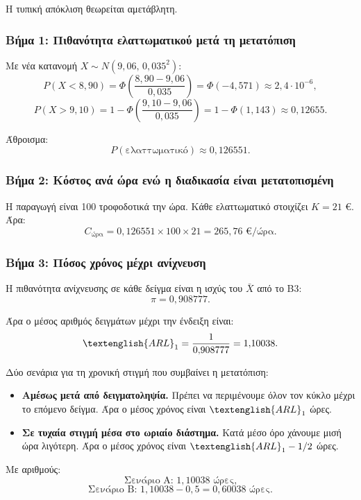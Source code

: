 \documentclass[12pt,a4paper]{article}
\newcommand{\ARL}{\textenglish{ARL}}
\begin{document}
Η τυπική απόκλιση θεωρείται αμετάβλητη.

\subsubsection*{Βήμα 1: Πιθανότητα ελαττωματικού μετά τη μετατόπιση}

Με νέα κατανομή \(X\sim N(9{,}06,\,0{,}035^2)\):
\[
    P(X<8{,}90)=\Phi\!\left(\frac{8{,}90-9{,}06}{0{,}035}\right)=\Phi(-4{,}571)\approx 2{,}4\cdot 10^{-6},
\]
\[
    P(X>9{,}10)=1-\Phi\!\left(\frac{9{,}10-9{,}06}{0{,}035}\right)=1-\Phi(1{,}143)\approx 0{,}12655.
\]

Άθροισμα:
\[
    P(\text{ελαττωματικό})\approx 0{,}126551.
\]

\subsubsection*{Βήμα 2: Κόστος ανά ώρα ενώ η διαδικασία είναι μετατοπισμένη}

Η παραγωγή είναι 100 τροφοδοτικά την ώρα. Κάθε ελαττωματικό στοιχίζει
\(K=21\) €. Άρα:
\[
    C_{\text{ώρα}}=0{,}126551\times 100\times 21=265{,}76 \text{ €/ώρα}.
\]

\subsubsection*{Βήμα 3: Πόσος χρόνος μέχρι ανίχνευση}

Η πιθανότητα ανίχνευσης σε κάθε δείγμα είναι η ισχύς του \(\bar X\) από το
Β3:
\[
    \pi=0{,}908777.
\]

Άρα ο μέσος αριθμός δειγμάτων μέχρι την ένδειξη είναι:
\[
    \ARL_1=\frac{1}{0{,}908777}=1{,}10038.
\]

Δύο σενάρια για τη χρονική στιγμή που συμβαίνει η μετατόπιση:

\begin{itemize}[leftmargin=2.2em]
    \item \textbf{Αμέσως μετά από δειγματοληψία.} Πρέπει να περιμένουμε όλον
    τον κύκλο μέχρι το επόμενο δείγμα. Άρα ο μέσος χρόνος είναι
    \(\ARL_1\) ώρες.
    \item \textbf{Σε τυχαία στιγμή μέσα στο ωριαίο διάστημα.} Κατά μέσο όρο
    χάνουμε μισή ώρα λιγότερη. Άρα ο μέσος χρόνος είναι \(\ARL_1-1/2\) ώρες.
\end{itemize}

Με αριθμούς:
\[
    \text{Σενάριο Α: } 1{,}10038 \text{ ώρες,}
\]
\[
    \text{Σενάριο Β: } 1{,}10038-0{,}5=0{,}60038 \text{ ώρες.}
\]
\end{document}

